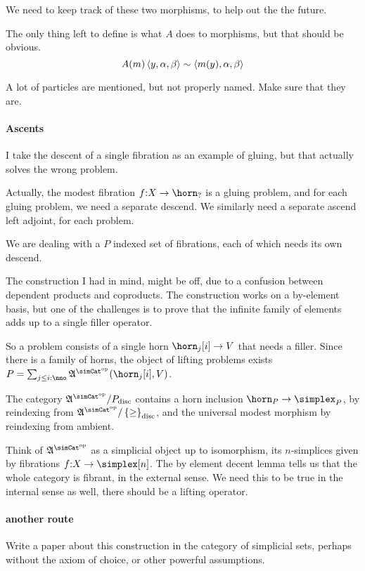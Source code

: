 \documentclass[csh.tex]{subfiles}
\begin{document}
We need to keep track of these two morphisms, to help out the the future.

The only thing left to define is what $A$ does to morphisms, but that should be obvious.
\[ A(m)\left\langle y,\alpha,\beta \right\rangle\sim \left\langle m(y),\alpha,\beta \right\rangle \]

A lot of particles are mentioned, but not properly named. Make sure that they are.

\paragraph{Ascents}
I take the descent of a single fibration as an example of gluing, but that actually solves the wrong problem.

Actually, the modest fibration $f\of X \to \horn_?$ is a gluing problem, and for each gluing problem, we need a separate descend. We similarly need a separate ascend left adjoint, for each problem.

We are dealing with a $P$ indexed set of fibrations, each of which needs its own descend.

The construction I had in mind, might be off, due to a confusion between dependent products and coproducts. The construction works on a by-element basis, but one of the challenges is to prove that the infinite family of elements adds up to a single filler operator.

So a problem consists of a single horn $\horn_j[i]\to V$ that needs a filler. Since there is a family of horns, the object of lifting problems exists $P = \sum_{j\leq i\of\nno}\ambient\s(\horn_j[i], V)$. 

The category $\ambient\s/P\disc$ contains a horn inclusion $\horn_P\to\simplex_P$, by reindexing from $\ambient\s/\set\geq\disc$, and the universal modest morphism by reindexing from ambient.

Think of $\ambient\s$ as a simplicial object up to isomorphism, its $n$-simplices given by fibrations $f\of X\to \simplex[n]$. The by element decent lemma tells us that the whole category is fibrant, in the external sense. We need this to be true in the internal sense as well, there should be a lifting operator.

\paragraph{another route}
Write a paper about this construction in the category of simplicial sets, perhaps without the axiom of choice, or other powerful assumptions.
\end{document}
